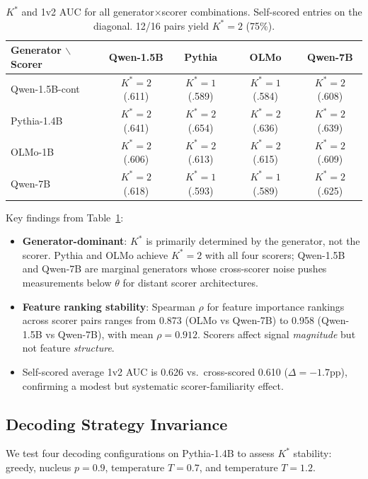 \documentclass[11pt]{article}
\newcommand{\kstar}{K^{*}}
\newcommand{\thetaval}{\theta}
\begin{document}
\begin{table}[t]
\centering
\caption{$\kstar$ and 1v2 AUC for all generator$\times$scorer combinations. Self-scored entries on the diagonal. 12/16 pairs yield $\kstar = 2$ (75\%).}
\label{tab:cross_scorer}
\small
\begin{tabular}{lcccc}
\toprule
\textbf{Generator $\backslash$ Scorer} & \textbf{Qwen-1.5B} & \textbf{Pythia} & \textbf{OLMo} & \textbf{Qwen-7B} \\
\midrule
Qwen-1.5B-cont & $\kstar{=}2$ (.611) & $\kstar{=}1$ (.589) & $\kstar{=}1$ (.584) & $\kstar{=}2$ (.608) \\
Pythia-1.4B & $\kstar{=}2$ (.641) & $\kstar{=}2$ (.654) & $\kstar{=}2$ (.636) & $\kstar{=}2$ (.639) \\
OLMo-1B & $\kstar{=}2$ (.606) & $\kstar{=}2$ (.613) & $\kstar{=}2$ (.615) & $\kstar{=}2$ (.609) \\
Qwen-7B & $\kstar{=}2$ (.618) & $\kstar{=}1$ (.593) & $\kstar{=}1$ (.589) & $\kstar{=}2$ (.625) \\
\bottomrule
\end{tabular}
\end{table}

Key findings from Table~\ref{tab:cross_scorer}:
\begin{itemize}
  \item \textbf{Generator-dominant}: $\kstar$ is primarily determined by the generator, not the scorer. Pythia and OLMo achieve $\kstar = 2$ with all four scorers; Qwen-1.5B and Qwen-7B are marginal generators whose cross-scorer noise pushes measurements below $\thetaval$ for distant scorer architectures.
  \item \textbf{Feature ranking stability}: Spearman $\rho$ for feature importance rankings across scorer pairs ranges from 0.873 (OLMo vs Qwen-7B) to 0.958 (Qwen-1.5B vs Qwen-7B), with mean $\rho = 0.912$. Scorers affect signal \emph{magnitude} but not feature \emph{structure}.
  \item Self-scored average 1v2 AUC is 0.626 vs.\ cross-scored 0.610 ($\Delta = -1.7$pp), confirming a modest but systematic scorer-familiarity effect.
\end{itemize}

\subsection{Decoding Strategy Invariance}
\label{sec:decoding}

We test four decoding configurations on Pythia-1.4B to assess $\kstar$ stability: greedy, nucleus $p{=}0.9$, temperature $T{=}0.7$, and temperature $T{=}1.2$.
\end{document}
